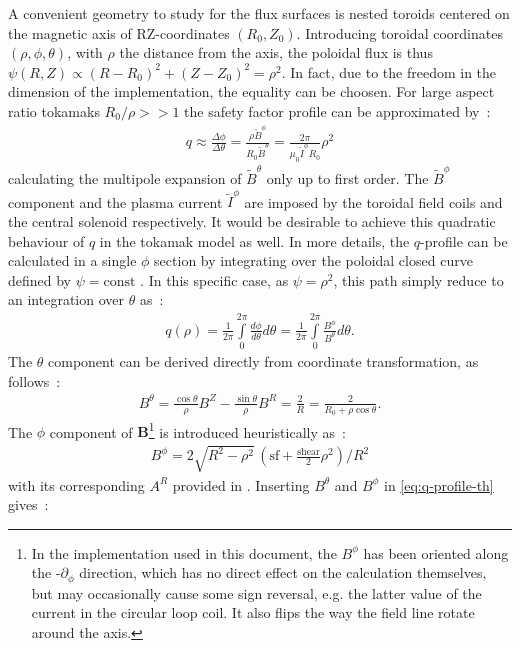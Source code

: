 A convenient geometry to study for the flux surfaces is nested toroids centered on the magnetic axis of RZ-coordinates $(R_0, Z_0)$. Introducing toroidal coordinates $(\rho, \phi, \theta)$, with $\rho$ the distance from the axis, the poloidal flux is thus $\psi(R, Z) \propto (R - R_0)^2 + (Z - Z_0)^2 = \rho^2$. In fact, due to the freedom in the dimension of the implementation, the equality can be choosen. For large aspect ratio tokamaks $R_0/\rho >> 1$ the safety factor profile can be approximated by~:
\begin{align*}
    q \approx \frac{\Delta\phi}{\Delta\theta} = \frac{\rho \tilde{B}^\phi}{R_0 \tilde{B}^\theta} = \frac{2\pi}{\mu_0\tilde{I}^\phi R_0} \rho^2
\end{align*}
calculating the multipole expansion of $\tilde{B}^\theta$ only up to first order. The $\tilde{B}^\phi$ component and the plasma current $\tilde{I}^\phi$ are imposed by the toroidal field coils and the central solenoid respectively. It would be desirable to achieve this quadratic behaviour of $q$ in the tokamak model as well. In more details, the $q$-profile can be calculated in a single $\phi$ section by integrating over the poloidal closed curve defined by $\psi = \text{const}$ \cite[pp.111-112]{wesson_tokamaks_2011}. In this specific case, as $\psi = \rho^2$, this path simply reduce to an integration over $\theta$ as~:
\begin{align}\label{eq:q-profile-th}
    q(\rho) = \frac{1}{2\pi}\int\limits_0^{2\pi} \frac{d\phi}{d\theta}d\theta = \frac{1}{2\pi}\int\limits_0^{2\pi} \frac{B^\phi}{B^\theta}d\theta.
\end{align}
The $\theta$ component can be derived directly from coordinate transformation, as follows~:
\begin{align*}
    B^\theta = \frac{\cos{\theta}}{\rho}B^Z - \frac{\sin{\theta}}{\rho}B^R = \frac{2}{R} = \frac{2}{R_0+\rho\cos{\theta}}.
\end{align*}
The $\phi$ component of $\textbf{B}$\footnote{In the implementation used in this document, the $B^\phi$ has been oriented along the -$\partial_\phi$ direction, which has no direct effect on the calculation themselves, but may occasionally cause some sign reversal, e.g. the latter value of the current in the circular loop coil. It also flips the way the field line rotate around the axis.} is introduced heuristically as~:
\begin{align*}
    B^\phi = 2\sqrt{R^2-\rho^2}\,(\text{sf}+\frac{\text{shear}}{2}\rho^2)/R^2
\end{align*}
with its corresponding $A^R$ provided in . Inserting $B^\theta$ and $B^\phi$ in \eqref{eq:q-profile-th} gives~:
